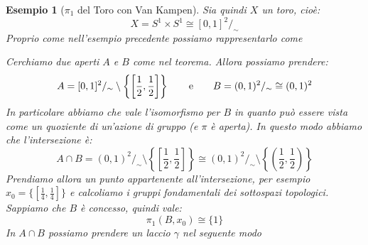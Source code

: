 \documentclass[11pt,a4paper,twoside]{article}
\newtheorem{es}{Esempio}
\theoremstyle{definition}
\begin{document}
\begin{es}[$\pi_1$ del Toro con Van Kampen]
	Sia quindi $X$ un toro, cioè:
	\[ X = S^1 \times S^1 \cong [0,1]^2/_\sim \]
	Proprio come nell'esempio precedente possiamo rappresentarlo come
	\begin{center}
	\end{center}
	Cerchiamo due aperti $A$ e $B$ come nel teorema. Allora possiamo prendere:
	\[ A = [0,1]^2/_\sim \setminus \left\{ \left[ \frac 12, \frac 12 \right] \right\} \qquad \text e \qquad B = (0,1)^2/_\sim \cong (0,1)^2\]
	In particolare abbiamo che vale l'isomorfismo per $B$ in quanto può essere vista come un quoziente di un'azione di gruppo (e $\pi$ è aperta).
	In questo modo abbiamo che l'intersezione è:
	\[ A\cap B = (0,1)^2/_\sim \setminus \left\{ \left[ \frac 12, \frac 12 \right] \right\}\cong (0,1)^2/_\sim \setminus \left\{ \left( \frac 12, \frac 12 \right) \right\} \]
	Prendiamo allora un punto appartenente all'intersezione, per esempio $x_0= \{[\frac 14, \frac 14]\}$ e calcoliamo i gruppi fondamentali dei sottospazi topologici. Sappiamo che $B$ è concesso, quindi vale:
	\[ \pi_1(B, x_0) \cong \{1\} \]
	In $A\cap B$ possiamo prendere un laccio $\gamma$ nel seguente modo
	\begin{center}
\end{center}
\end{es}
\end{document}
